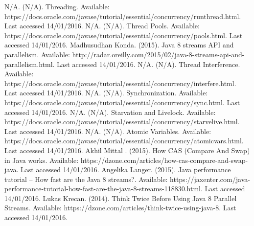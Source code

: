 \documentclass[]{report}
\begin{document}
\begin{thebibliography}{20}
	N/A. (N/A). Threading. Available: https://docs.oracle.com/javase/tutorial/essential/concurrency/runthread.html. Last accessed 14/01/2016.
	N/A. (N/A). Thread Pools. Available: https://docs.oracle.com/javase/tutorial/essential/concurrency/pools.html. Last accessed 14/01/2016.
	Madhusudhan Konda. (2015). Java 8 streams API and parallelism. Available: http://radar.oreilly.com/2015/02/java-8-streams-api-and-parallelism.html. Last accessed 14/01/2016.
	N/A. (N/A). Thread Interference. Available: https://docs.oracle.com/javase/tutorial/essential/concurrency/interfere.html. Last accessed 14/01/2016.
	N/A. (N/A). Synchronization. Available: https://docs.oracle.com/javase/tutorial/essential/concurrency/sync.html. Last accessed 14/01/2016.
	N/A. (N/A). Starvation and Livelock. Available: https://docs.oracle.com/javase/tutorial/essential/concurrency/starvelive.html. Last accessed 14/01/2016.
	N/A. (N/A). Atomic Variables. Available: https://docs.oracle.com/javase/tutorial/essential/concurrency/atomicvars.html. Last accessed 14/01/2016.
	Akhil Mittal . (2015). How CAS (Compare And Swap) in Java works. Available: https://dzone.com/articles/how-cas-compare-and-swap-java. Last accessed 14/01/2016.
	Angelika Langer. (2015). Java performance tutorial – How fast are the Java 8 streams?. Available: https://jaxenter.com/java-performance-tutorial-how-fast-are-the-java-8-streams-118830.html. Last accessed 14/01/2016.
	Lukas Krecan. (2014). Think Twice Before Using Java 8 Parallel Streams. Available: https://dzone.com/articles/think-twice-using-java-8. Last accessed 14/01/2016.
\end{thebibliography}
\end{document}
